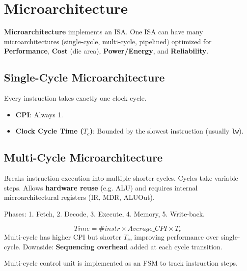 \section{Microarchitecture}

\begin{definition}
\textbf{Microarchitecture} implements an ISA. One ISA can have many microarchitectures (single-cycle, multi-cycle, pipelined) optimized for \textbf{Performance}, \textbf{Cost} (die area), \textbf{Power/Energy}, and \textbf{Reliability}.
\end{definition}

\subsection{Single-Cycle Microarchitecture}

\begin{definition}
Every instruction takes exactly one clock cycle.
\begin{itemize}
    \item \textbf{CPI}: Always 1.
    \item \textbf{Clock Cycle Time ($T_c$)}: Bounded by the slowest instruction (usually \texttt{lw}).
\end{itemize}
\end{definition}

\subsection{Multi-Cycle Microarchitecture}

\begin{definition}
Breaks instruction execution into multiple shorter cycles. Cycles take variable steps.
Allows \textbf{hardware reuse} (e.g. ALU) and requires internal microarchitectural registers (IR, MDR, ALUOut).
\end{definition}

\begin{example}
Phases: 1. Fetch, 2. Decode, 3. Execute, 4. Memory, 5. Write-back.
\end{example}

\begin{theorem}
$$Time = \#instr \times Average\_CPI \times T_c$$
Multi-cycle has higher CPI but shorter $T_c$, improving performance over single-cycle.
Downside: \textbf{Sequencing overhead} added at each cycle transition.
\end{theorem}

\begin{remark}
Multi-cycle control unit is implemented as an FSM to track instruction steps.
\end{remark}

